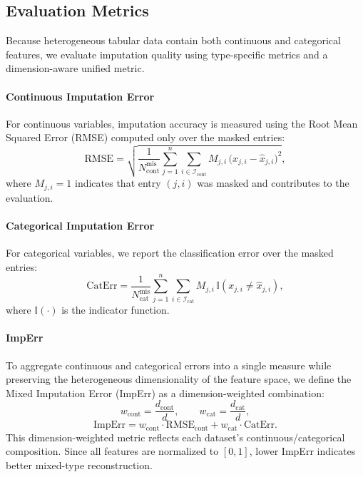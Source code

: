 \documentclass[times, review, 10pt]{elsarticle}
\begin{document}


\subsection{Evaluation Metrics}

Because heterogeneous tabular data contain both continuous and categorical
features, we evaluate imputation quality using type-specific metrics and a
dimension-aware unified metric.

\paragraph{Continuous Imputation Error}
For continuous variables, imputation accuracy is measured using the Root
Mean Squared Error (RMSE) computed only over the masked entries:
\[
\mathrm{RMSE}
=
\sqrt{
\frac{1}{N_{\mathrm{cont}}^{\mathrm{mis}}}
\sum_{j=1}^{n}
\sum_{i \in \mathcal{I}_{\mathrm{cont}}}
M_{j,i}\,\big(x_{j,i} - \hat{x}_{j,i}\big)^{2}
},
\]
where \(M_{j,i}=1\) indicates that entry \((j,i)\) was masked and contributes
to the evaluation.

\paragraph{Categorical Imputation Error}
For categorical variables, we report the classification error over the masked
entries:
\[
\mathrm{CatErr}
=
\frac{1}{N_{\mathrm{cat}}^{\mathrm{mis}}}
\sum_{j=1}^{n}
\sum_{i \in \mathcal{I}_{\mathrm{cat}}}
M_{j,i}\,\mathbb{I}(x_{j,i} \neq \hat{x}_{j,i}),
\]
where \(\mathbb{I}(\cdot)\) is the indicator function.

\paragraph{ImpErr}
To aggregate continuous and categorical errors into a single measure while
preserving the heterogeneous dimensionality of the feature space, we define
the Mixed Imputation Error (ImpErr) as a dimension-weighted combination:
\[
w_{\mathrm{cont}} = \frac{d_{\mathrm{cont}}}{d},
\qquad
w_{\mathrm{cat}} = \frac{d_{\mathrm{cat}}}{d},
\]
\[
\mathrm{ImpErr}
=
w_{\mathrm{cont}} \cdot \mathrm{RMSE}_{\mathrm{cont}}
+
w_{\mathrm{cat}} \cdot \mathrm{CatErr}.
\]
This dimension-weighted metric reflects each dataset's continuous/categorical
composition. Since all features are normalized to \([0,1]\), lower ImpErr
indicates better mixed-type reconstruction.
\end{document}
